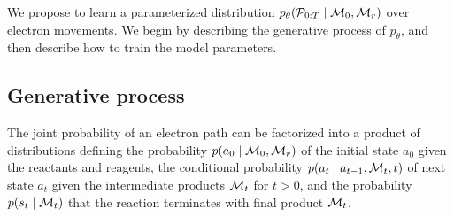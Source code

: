 We propose to learn a parameterized distribution $p_\theta( {\mathcal{P}}_{0:T} \mid {\mathcal{M}}_0, {\mathcal{M}}_r)$ over electron movements. 
We begin by describing the generative process %
of $p_\theta$, and then describe how to train the model parameters.


\subsection{Generative process}

The joint probability of an electron path can be factorized into a product of distributions
defining the probability $p(a_0 \mid {\mathcal{M}}_0, {\mathcal{M}}_r)$ of the initial state $a_0$ given the reactants and reagents, 
the conditional probability $p(a_t \mid a_{t-1}, {\mathcal{M}}_t, t)$  of next state $a_t$ given the intermediate products ${\mathcal{M}}_t$ for $t > 0$,
and the probability $p(s_t \mid {\mathcal{M}}_t)$ that the reaction terminates with final product ${\mathcal{M}}_{t}$.

%



